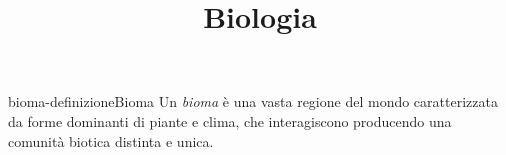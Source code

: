 \documentclass[preview]{standalone}
\begin{document}
\title{Biologia}
\genpage

\begin{snippetdefinition}{bioma-definizione}{Bioma}
    Un \textit{bioma} è una vasta regione del mondo caratterizzata da forme dominanti
    di piante e clima, che interagiscono producendo una comunità biotica distinta e unica.
\end{snippetdefinition}



\end{document}
